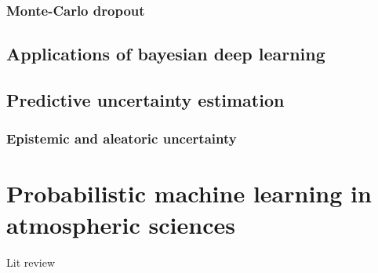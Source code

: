 \subsubsection{Monte-Carlo dropout}

\subsection{Applications of bayesian deep learning}
\subsection{Predictive uncertainty estimation}
\subsubsection{Epistemic and aleatoric uncertainty}

\section{Probabilistic machine learning in atmospheric sciences}
Lit review

